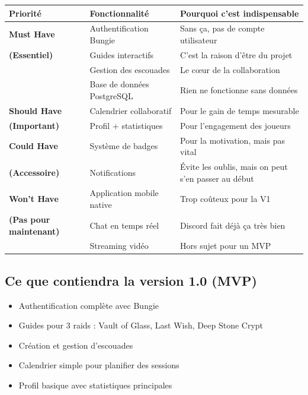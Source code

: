 \begin{center}
    \begin{tabular}{|p{2.5cm}|p{3.5cm}|p{4cm}|}
        \hline
        \textbf{Priorité} & \textbf{Fonctionnalité} & \textbf{Pourquoi c'est indispensable} \\
        \hline
        \textbf{Must Have} & Authentification Bungie & Sans ça, pas de compte utilisateur \\
        \textbf{(Essentiel)} & Guides interactifs & C'est la raison d'être du projet \\
        & Gestion des escouades & Le cœur de la collaboration \\
        & Base de données PostgreSQL & Rien ne fonctionne sans données \\
        \hline
        \textbf{Should Have} & Calendrier collaboratif & Pour le gain de temps mesurable \\
        \textbf{(Important)} & Profil + statistiques & Pour l'engagement des joueurs \\
        \hline
        \textbf{Could Have} & Système de badges & Pour la motivation, mais pas vital \\
        \textbf{(Accessoire)} & Notifications & Évite les oublis, mais on peut s'en passer au début \\
        \hline
        \textbf{Won't Have} & Application mobile native & Trop coûteux pour la V1 \\
        \textbf{(Pas pour maintenant)} & Chat en temps réel & Discord fait déjà ça très bien \\
        & Streaming vidéo & Hors sujet pour un MVP \\
        \hline
    \end{tabular}
\end{center}

\subsection*{Ce que contiendra la version 1.0 (MVP)}
\begin{itemize}
    \item Authentification complète avec Bungie
    \item Guides pour 3 raids : Vault of Glass, Last Wish, Deep Stone Crypt
    \item Création et gestion d'escouades
    \item Calendrier simple pour planifier des sessions
    \item Profil basique avec statistiques principales
\end{itemize}


